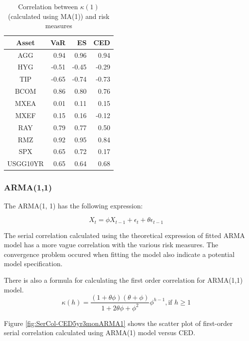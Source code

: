 \documentclass[12pt]{article}
\begin{document}
\fi

\begin{table}[!h]
\caption{Correlation between $\kappa(1)$ (calculated using MA(1)) and risk measures}
\centering 
\begin{tabular}{ | c || r r r| } 
 \hline
Asset & VaR  & ES & CED \\
  \hline \hline
AGG & 0.94 & 0.96 & 0.94 \\ 
HYG & -0.51 & -0.45 &  -0.29 \\ 
TIP & -0.65 & -0.74 &  -0.73 \\ 
BCOM & 0.86 & 0.80 & 0.76 \\ 
MXEA & 0.01 & 0.11 & 0.15 \\ 
MXEF & 0.15 & 0.16 & -0.12 \\ 
RAY & 0.79 & 0.77 & 0.50 \\ 
RMZ & 0.92 & 0.95 &  0.84 \\ 
SPX & 0.65 & 0.72 & 0.17 \\ 
USGG10YR & 0.65 & 0.64 &  0.68 \\
 \hline
\end{tabular}
\label{table:corSerialRisk2}
\end{table}

\subsubsection{ARMA(1,1)}

The ARMA(1, 1) has the following expression:

\begin{equation}
X_t = \phi X_{t-1} + \epsilon_t + \theta\epsilon_{t-1}
\end{equation}

The serial correlation calculated using the theoretical expression of fitted ARMA model has a more vague correlation with the various risk measures. The convergence problem occured when fitting the model also indicate a potential model specification.

There is also a formula for calculating the first order correlation for ARMA(1,1) model.
\begin{equation}
\kappa(h) = \frac{(1+\theta \phi)(\theta + \phi)}{1+ 2\theta \phi +\phi^2} \phi^{h-1}, \mbox{if } h \geq 1
\end{equation}

Figure \ref{fig:SerCol-CED5yr3monARMA1} shows the scatter plot of first-order serial correlation calculated using ARMA(1) model versus CED.
\end{document}

